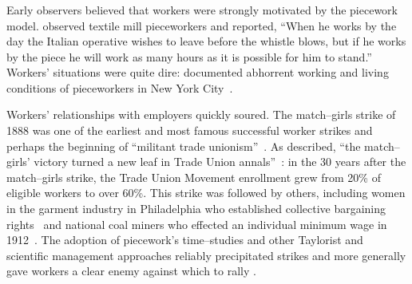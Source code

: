 \documentclass[trackingWork]{subfiles}
\begin{document}



\subsubsection{\pieceworkpers}
Early observers believed that workers were strongly motivated by the piecework model.
\citeauthor{clark1908cotton} observed textile mill pieceworkers and reported,
``When he works by the day the Italian operative wishes to leave before the whistle blows,
but if he works by the piece he will work as many hours as it is possible for him to stand.''
Workers' situations were quite dire: \citeauthor{riisOtherSideLives}  documented abhorrent working and living conditions of pieceworkers in New York City~\cite{riisOtherSideLives}.

Workers' relationships with employers quickly soured.
The match--girls strike of 1888 was one of the earliest and most famous successful worker strikes and perhaps the beginning of ``militant trade unionism''~\cite{10.2307/3827491}.
As \citeauthor{weyer1894history} described, ``the match--girls' victory turned a new leaf in Trade Union annals''~\cite{weyer1894history}: in the 30 years after the match--girls strike, the Trade Union Movement enrollment grew from 20\% of eligible workers to over 60\%.
This strike was followed by others, including women in the garment industry in Philadelphia who established collective bargaining rights~\cite{10.2307/41829256} and national coal miners who effected an individual minimum wage in 1912~\cite{10.2307/2221944}.
The adoption of piecework's time--studies and other Taylorist and scientific management approaches reliably precipitated strikes and more generally gave workers a clear enemy against which to rally
\cite{jacoby1983union}.
\end{document}
